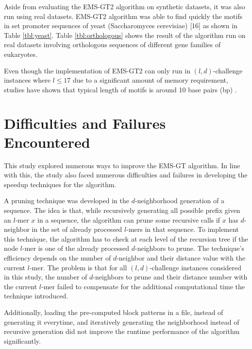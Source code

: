 

Aside from evaluating the EMS-GT2 algorithm on synthetic datasets, it was also run using real datasets. EMS-GT2 algorithm was able to find quickly the motifs in set promoter sequences of yeast (Saccharomyces cerevisiae) [16] as shown in Table \ref{tbl:yeast}. Table \ref{tbl:orthologous} shows the result of the algorithm run on real datasets involving orthologous sequences of different gene families of eukaryotes.





Even though the implementation of EMS-GT2 can only run in $(l, d)$-challenge instances where $l \leq 17$ due to a significant amount of memory requirement, studies have shown that typical length of motifs is around 10 base pairs (bp) \cite{stewart2012transcription}.


\section{Difficulties and Failures Encountered}

This study explored numerous ways to improve the EMS-GT algorithm. In line with this, the study also faced numerous difficulties and failures in developing the speedup techniques for the algorithm.

A pruning technique was developed in the $d$-neighborhood generation of a sequence. The idea is that, while recursively generating all possible prefix given an $l$-mer $x$ in a sequence, the algorithm can prune some recursive calls if $x$ has $d$-neighbor in the set of already processed $l$-mers in that sequence. To implement this technique, the algorithm has to check at each level of the recursion tree if the node $l$-mer is one of the already processed $d$-neighbors to prune. The technique's efficiency depends on the number of $d$-neighbor and their distance value with the current $l$-mer. The problem is that for all $(l, d)$-challenge instances considered in this study, the number of $d$-neighbors to prune and their distance number with the current $l$-mer failed to compensate for the additional computational time the technique introduced.

Additionally, loading the pre-computed block patterns in a file, instead of generating it everytime, and iteratively generating the neighborhood instead of recursive generation did not improve the runtime performance of the algorithm significantly.






